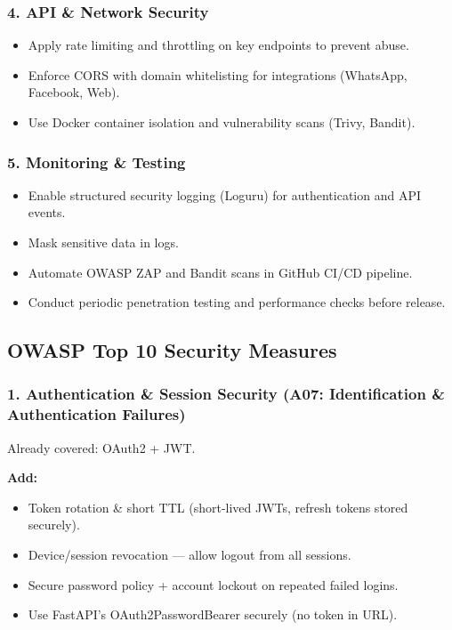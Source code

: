 \documentclass[12pt,a4paper]{article}
\begin{document}
\subsubsection{4. API \& Network Security}
\begin{itemize}
    \item Apply rate limiting and throttling on key endpoints to prevent abuse.
    \item Enforce CORS with domain whitelisting for integrations (WhatsApp, Facebook, Web).
    \item Use Docker container isolation and vulnerability scans (Trivy, Bandit).
\end{itemize}

\subsubsection{5. Monitoring \& Testing}
\begin{itemize}
    \item Enable structured security logging (Loguru) for authentication and API events.
    \item Mask sensitive data in logs.
    \item Automate OWASP ZAP and Bandit scans in GitHub CI/CD pipeline.
    \item Conduct periodic penetration testing and performance checks before release.
\end{itemize}

\subsection{OWASP Top 10 Security Measures}

\subsubsection{1. Authentication \& Session Security (A07: Identification \& Authentication Failures)}
Already covered: OAuth2 + JWT.

\textbf{Add:}
\begin{itemize}
    \item Token rotation \& short TTL (short-lived JWTs, refresh tokens stored securely).
    \item Device/session revocation — allow logout from all sessions.
    \item Secure password policy + account lockout on repeated failed logins.
    \item Use FastAPI’s OAuth2PasswordBearer securely (no token in URL).
\end{itemize}
\end{document}

